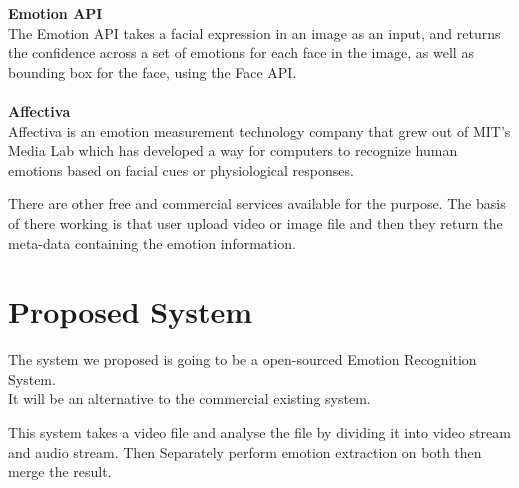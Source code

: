 \fontsize{14}{0}\textbf{Emotion API}\\
The Emotion API takes a facial expression in an image as an input, and returns the confidence across a set of emotions for each face in the image, as well as bounding box for the face, using the Face API.\\\\
\fontsize{14}{0}\textbf{Affectiva}\\
Affectiva is an emotion measurement technology company that grew out of MIT's Media Lab which has developed a way for computers to recognize human emotions based on facial cues or physiological responses.

There are other free and commercial services available for the purpose. The basis of there working is that user upload video or image file and then they return the meta-data containing the emotion information.

\section{Proposed System}
The system we proposed is going to be a open-sourced Emotion Recognition System.\\
It will be an alternative to the commercial existing system.

This system takes a video file and analyse the file by dividing it into video stream and audio stream. Then Separately perform emotion extraction on both then merge the result.